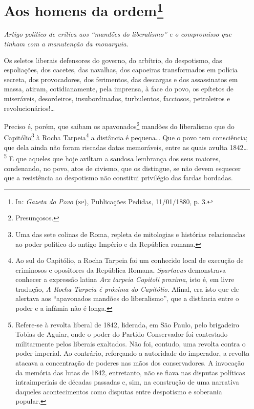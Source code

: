 \chapter{Aos homens da ordem\footnote{In: \emph{Gazeta do Povo}
  (\textsc{sp}), Publicações Pedidas, 11/01/1880, p. 3.}}

\begin{resumo}
\emph{Artigo político de crítica aos ``mandões do liberalismo'' e o
compromisso que tinham com a manutenção da monarquia.}
\end{resumo}


Os seletos liberais defensores do governo, do arbítrio, do despotismo,
das espoliações, dos cacetes, das navalhas, dos capoeiras transformados
em polícia secreta, dos provocadores, dos ferimentos, das descargas e
dos assassinatos em massa, atiram, cotidianamente, pela imprensa, à face
do povo, os epítetos de miseráveis, desordeiros, insubordinados,
turbulentos, facciosos, petroleiros e revolucionários!\ldots{}

Preciso é, porém, que saibam os apavonados\footnote{Presunçosos.}
mandões do liberalismo que do Capitólio\footnote{Uma das sete colinas
  de Roma, repleta de mitologias e histórias relacionadas ao poder
  político do antigo Império e da República romana.} à Rocha
Tarpeia\footnote{Ao sul do Capitólio, a Rocha Tarpeia foi um conhecido
  local de execução de criminosos e opositores da República Romana.
  \emph{Spartacus} demonstrava conhecer a expressão latina \emph{Arx
  tarpeia Capitoli proxima}, isto é, em livre tradução, \emph{A Rocha
  Tarpeia é próxima do Capitólio}. Afinal, era isto que ele alertava aos
  ``apavonados mandões do liberalismo'', que a distância entre o poder e a
  infâmia não é longa.} a distância é pequena\ldots{} Que o povo tem
consciência; que dela ainda não foram riscadas datas memoráveis, entre
as quais avulta 1842\ldots{}\footnote{Refere-se à revolta liberal de 1842,
  liderada, em São Paulo, pelo brigadeiro Tobias de Aguiar, onde o poder
  do Partido Conservador foi contestado militarmente pelos liberais
  exaltados. Não foi, contudo, uma revolta contra o poder imperial. Ao
  contrário, reforçando a autoridade do imperador, a revolta atacava a
  concentração de poderes nas mãos dos conservadores. A invocação da
  memória das lutas de 1842, entretanto, não se fiava nas disputas
  políticas intraimperiais de décadas passadas e, sim, na construção de
  uma narrativa daqueles acontecimentos como disputas entre despotismo e
  soberania popular.} E que
aqueles que hoje aviltam a saudosa lembrança dos seus maiores,
condenando, no povo, atos de civismo, que os distingue, se não devem
esquecer que a resistência ao despotismo não constitui privilégio das
fardas bordadas.

